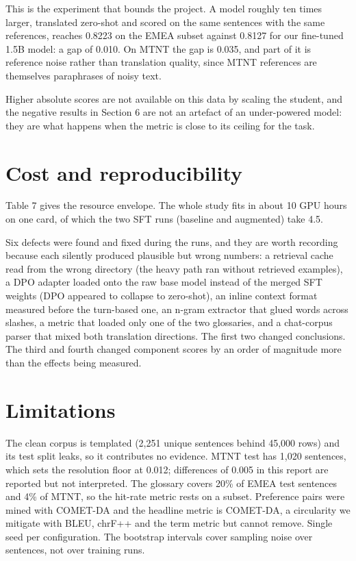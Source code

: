 \documentclass[a4paper,12pt,oneside]{article}
\begin{document}
This is the experiment that bounds the project. A model roughly ten times larger, translated
zero-shot and scored on the same sentences with the same references, reaches 0.8223 on the EMEA
subset against 0.8127 for our fine-tuned 1.5B model: a gap of 0.010. On MTNT the gap is 0.035,
and part of it is reference noise rather than translation quality, since MTNT references are
themselves paraphrases of noisy text.

Higher absolute scores are not available on this data by scaling the student, and the negative
results in Section 6 are not an artefact of an under-powered model: they are what happens when
the metric is close to its ceiling for the task.

\section{Cost and reproducibility}

Table 7 gives the resource envelope. The whole study fits in about 10 GPU hours on one card, of
which the two SFT runs (baseline and augmented) take 4.5.

Six defects were found and fixed during the runs, and they are worth recording because each
silently produced plausible but wrong numbers: a retrieval cache read from the wrong directory
(the heavy path ran without retrieved examples), a DPO adapter loaded onto the raw base model
instead of the merged SFT weights (DPO appeared to collapse to zero-shot), an inline context
format measured before the turn-based one, an n-gram extractor that glued words across slashes,
a metric that loaded only one of the two glossaries, and a chat-corpus parser that mixed both
translation directions. The first two changed conclusions. The third and fourth changed
component scores by an order of magnitude more than the effects being measured.

\section{Limitations}

The clean corpus is templated (2,251 unique sentences behind 45,000 rows) and its test split
leaks, so it contributes no evidence. MTNT test has 1,020 sentences, which sets the resolution
floor at 0.012; differences of 0.005 in this report are reported but not interpreted. The
glossary covers 20\% of EMEA test sentences and 4\% of MTNT, so the hit-rate metric rests on a
subset. Preference pairs were mined with COMET-DA and the headline metric is COMET-DA, a
circularity we mitigate with BLEU, chrF++ and the term metric but cannot remove. Single seed per
configuration. The bootstrap intervals cover sampling noise over sentences, not over training
runs.
\end{document}
